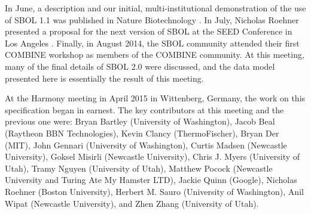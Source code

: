 In June, a description and our initial, multi-institutional demonstration of the use of SBOL 1.1 was published in Nature Biotechnology \cite{galdzicki2014synthetic}. In July, Nicholas Roehner presented a proposal for the next version of SBOL at the SEED Conference in Los Angeles \cite{roehner2014proposed}.  Finally, in August 2014, the SBOL community attended their first COMBINE workshop as members of the COMBINE community.  At this meeting, many of the final details of SBOL 2.0 were discussed, and the data model presented here is essentially the result of this meeting.

At the Harmony meeting in April 2015 in Wittenberg, Germany, the work on this specification began in earnest.  The key contributors at this meeting and the previous one were: Bryan Bartley (University of Washington), Jacob Beal (Raytheon BBN Technologies), Kevin Clancy (ThermoFischer), Bryan Der (MIT), John Gennari (University of Washington), Curtis Madsen (Newcastle University), Goksel Misirli (Newcastle University), Chris J. Myers (University of Utah), Tramy Nguyen (University of Utah), Matthew Pocock (Newcastle University and Turing Ate My Hamster LTD), Jackie Quinn (Google), Nicholas Roehner (Boston University), Herbert M. Sauro (University of Washington), Anil Wipat (Newcastle University), and Zhen Zhang (University of Utah).